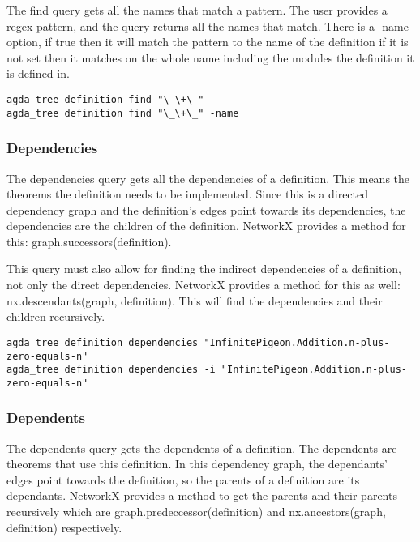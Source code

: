 The find query gets all the names that match a pattern. The user provides a
regex pattern, and the query returns all the names that match.
There is a -name option, if true then it will match the pattern to the name of
the definition if it is not set then it matches on the whole name including the
modules the definition it is defined in.

\begin{lstlisting}
agda_tree definition find "\_\+\_"
agda_tree definition find "\_\+\_" -name
\end{lstlisting}

\subsubsection{Dependencies}

The dependencies query gets all the dependencies of a definition. This means
the theorems the definition needs to be implemented. Since this is a directed
dependency graph and the definition's edges point towards its dependencies, the
dependencies are the children of the definition. NetworkX provides a method for
this: \linebreak \textsf{graph.successors(definition)}.

This query must also allow for finding the indirect dependencies of a
definition, not only the direct dependencies. NetworkX provides a method for
this as well: \textsf{nx.descendants(graph, definition)}. This will find the
dependencies and their children recursively.

\begin{lstlisting}
agda_tree definition dependencies "InfinitePigeon.Addition.n-plus-zero-equals-n"
agda_tree definition dependencies -i "InfinitePigeon.Addition.n-plus-zero-equals-n"
\end{lstlisting}

\subsubsection{Dependents}

The dependents query gets the dependents of a definition. The dependents are
theorems that use this definition. In this dependency graph, the dependants'
edges point towards the definition, so the parents of a definition are its
dependants. NetworkX provides a method to get the parents and their parents
recursively which are \textsf{graph.predeccessor(definition)} and
\textsf{nx.ancestors(graph, definition)} respectively.

